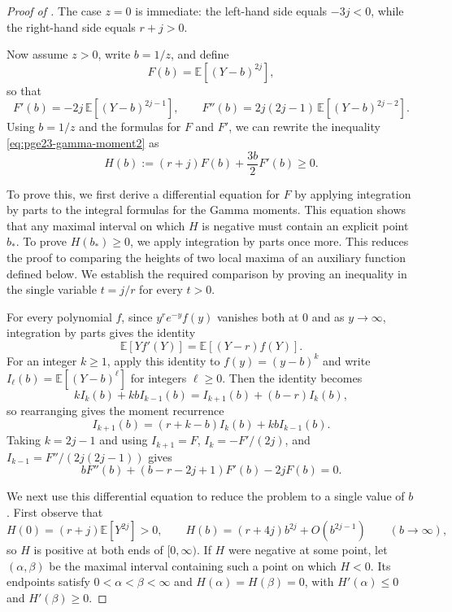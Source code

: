 \documentclass[11pt]{article}
\theoremstyle{remark}
\numberwithin{equation}{section}
\newcommand{\E}{\mathbb E}
\begin{document}
\begin{proof}[Proof of ]
  The case $z=0$ is immediate: the left-hand side equals $-3j<0$, while
  the right-hand side equals $r+j>0$.

  Now assume $z>0$, write $b=1/z$, and define
  \[
    F(b)=\E\left[(Y-b)^{2j}\right],
  \]
  so that
  \[
    F'(b)=-2j\,\E\left[(Y-b)^{2j-1}\right],
    \qquad
    F''(b)=2j(2j-1)\,\E\left[(Y-b)^{2j-2}\right].
  \]
  Using $b=1/z$ and the formulas for $F$ and $F'$, we can rewrite the
  inequality \eqref{eq:pge23-gamma-moment2} as
  \begin{equation}\label{eq:pge23-gamma-H}
    H(b):=(r+j)F(b)+\frac{3b}{2}F'(b)\ge0.
  \end{equation}

  To prove this, we first derive a differential equation for $F$ by applying
  integration by parts to the integral formulas for the Gamma moments.
  This equation shows that any maximal interval
  on which $H$ is negative must contain an explicit point $b_*$.
  To prove $H(b_*)\ge0$, we apply integration by parts once more.
  This reduces the proof to comparing the heights of two local maxima
  of an auxiliary function defined below.
  We establish the required comparison by proving an inequality in the
  single variable $t=j/r$ for every $t>0$.

  For every polynomial $f$, since $y^re^{-y}f(y)$ vanishes both at $0$ and as $y\to\infty$, integration by parts gives the identity
  \begin{equation*}
    \E\left[Yf'(Y)\right]=\E\left[(Y-r)f(Y)\right].
  \end{equation*}
  For an integer $k\ge1$, apply this identity to $f(y)=(y-b)^k$
  and write $I_\ell(b)=\E\left[(Y-b)^\ell\right]$ for integers $\ell\ge0$.
  Then the identity becomes
  \[
    kI_k(b)+kbI_{k-1}(b)=I_{k+1}(b)+(b-r)I_k(b),
  \]
  so rearranging gives the moment recurrence
  \begin{equation*}
    I_{k+1}(b)=(r+k-b)I_k(b)+kbI_{k-1}(b).
  \end{equation*}
  Taking $k=2j-1$ and using $I_{k+1}=F$,
  $I_k=-F'/(2j)$, and $I_{k-1}=F''/(2j(2j-1))$ gives
  \begin{equation}\label{eq:pge23-gamma-ODE}
    bF''(b)+(b-r-2j+1)F'(b)-2jF(b)=0.
  \end{equation}

  We next use this differential equation to reduce the problem to a
  single value of $b$.
  First observe that
  \[
    H(0)=(r+j)\E\left[Y^{2j}\right]>0,
    \qquad
    H(b)=(r+4j)b^{2j}+O(b^{2j-1})
    \qquad(b\to\infty),
  \]
  so $H$ is positive at both ends of $[0,\infty)$.
  If $H$ were negative at some point, let $(\alpha,\beta)$ be the maximal
  interval containing such a point on which $H<0$.
  Its endpoints satisfy $0<\alpha<\beta<\infty$ and
  $H(\alpha)=H(\beta)=0$, with $H'(\alpha)\le0$ and $H'(\beta)\ge0$.


\end{proof}
\end{document}
